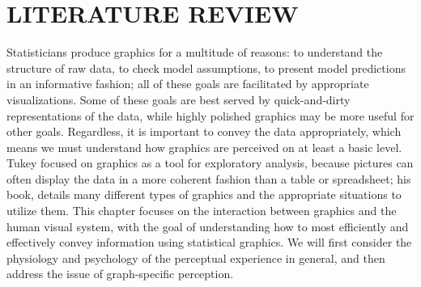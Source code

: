 \documentclass[11pt]{isuthesis}\usepackage[]{graphicx}\usepackage[]{color}
\begin{document}

% 
\tableofcontents
{} \cleardoublepage {}
{}
\listoftables
\cleardoublepage {} {}
\listoffigures
\cleardoublepage {}

\cleardoublepage {}

\newpage
{}



\graphicspath{{Figure/LitReview/}{Images/LitReview/}}
\renewcommand{\floatpagefraction}{.99}



\chapter{LITERATURE REVIEW}\label{litreview}

Statisticians produce graphics for a multitude of reasons: to understand the structure of raw data, to check model assumptions, to present model predictions in an informative fashion; all of these goals are facilitated by appropriate visualizations. Some of these goals are best served by quick-and-dirty representations of the data, while highly polished graphics may be more useful for other goals. Regardless, it is important to convey the data appropriately, which means we must understand how graphics are perceived on at least a basic level. Tukey focused on graphics as a tool for exploratory analysis, because pictures can often display the data in a more coherent fashion than a table or spreadsheet; his book, \citet{eda} details many different types of graphics and the appropriate situations to utilize them. This chapter focuses on the interaction between graphics and the human visual system, with the goal of understanding how  to most efficiently and effectively convey information using statistical graphics. We will first consider the physiology and psychology of the perceptual experience in general, and then address the issue of graph-specific perception. 
\end{document}

